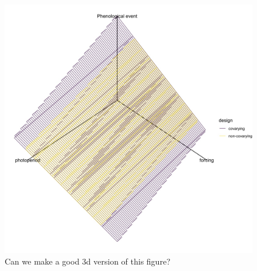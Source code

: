 \documentclass[11pt]{article}
\begin{document}
{ \begin{figure}[h!]
    \centering
 \includegraphics[width=.8\textwidth]{..//Plots/periodicity_figures/orthog.jpeg}
    \caption{Can we make a good 3d version of this figure?}
    \label{fig:3d}
\end{figure}
 
}
\end{document}
